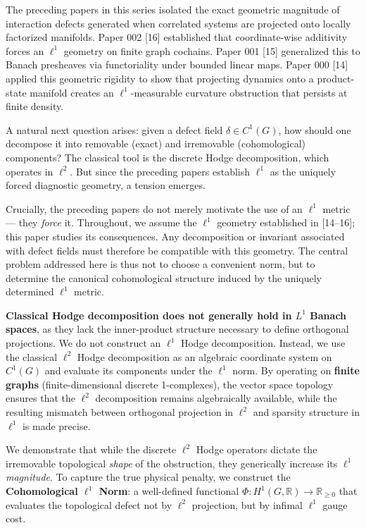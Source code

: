 \documentclass[
]{article}
\begin{document}
The preceding papers in this series isolated the exact geometric
magnitude of interaction defects generated when correlated systems are
projected onto locally factorized manifolds. Paper 002 {[}16{]}
established that coordinate-wise additivity forces an \(\ell^1\)
geometry on finite graph cochains. Paper 001 {[}15{]} generalized this
to Banach presheaves via functoriality under bounded linear maps. Paper
000 {[}14{]} applied this geometric rigidity to show that projecting
dynamics onto a product-state manifold creates an \(\ell^1\)-measurable
curvature obstruction that persists at finite density.

A natural next question arises: given a defect field
\(\delta \in C^1(G)\), how should one decompose it into removable
(exact) and irremovable (cohomological) components? The classical tool
is the discrete Hodge decomposition, which operates in \(\ell^2\). But
since the preceding papers establish \(\ell^1\) as the uniquely forced
diagnostic geometry, a tension emerges.

Crucially, the preceding papers do not merely motivate the use of an
\(\ell^1\) metric --- they \emph{force} it. Throughout, we assume the
\(\ell^1\) geometry established in {[}14--16{]}; this paper studies its
consequences. Any decomposition or invariant associated with defect
fields must therefore be compatible with this geometry. The central
problem addressed here is thus not to choose a convenient norm, but to
determine the canonical cohomological structure induced by the uniquely
determined \(\ell^1\) metric.

\textbf{Classical Hodge decomposition does not generally hold in \(L^1\)
Banach spaces}, as they lack the inner-product structure necessary to
define orthogonal projections. We do not construct an \(\ell^1\) Hodge
decomposition. Instead, we use the classical \(\ell^2\) Hodge
decomposition as an algebraic coordinate system on \(C^1(G)\) and
evaluate its components under the \(\ell^1\) norm. By operating on
\textbf{finite graphs} (finite-dimensional discrete 1-complexes), the
vector space topology ensures that the \(\ell^2\) decomposition remains
algebraically available, while the resulting mismatch between orthogonal
projection in \(\ell^2\) and sparsity structure in \(\ell^1\) is made
precise.

We demonstrate that while the discrete \(\ell^2\) Hodge operators
dictate the irremovable topological \emph{shape} of the obstruction,
they generically increase its \(\ell^1\) \emph{magnitude}. To capture
the true physical penalty, we construct the \textbf{Cohomological
\(\ell^1\) Norm}: a well-defined functional
\(\Phi : H^1(G, \mathbb{R}) \to \mathbb{R}_{\geq 0}\) that evaluates the
topological defect not by \(\ell^2\) projection, but by infimal
\(\ell^1\) gauge cost.
\end{document}
